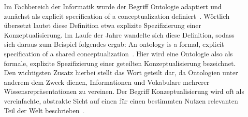 Im Fachbereich der Informatik wurde der Begriff Ontologie adaptiert und zunächst als \glqq{}explicit specification of a conceptualization\grqq{} definiert~\cite{Gruber1993}.
Wörtlich übersetzt lautet diese Definition etwa \glqq{}explizite Spezifizierung einer Konzeptualisierung\grqq{}.
Im Laufe der Jahre wandelte sich diese Definition, sodass sich daraus zum Beispiel folgendes ergab: \glqq{}An ontology is a formal, explicit specification of a shared conceptualization\grqq{}~\cite{Studer1998}.
Hier wird eine Ontologie also als \glqq{}formale, explizite Spezifizierung einer geteilten Konzeptualisierung\grqq{} bezeichnet.
Den wichtigsten Zusatz hierbei stellt das Wort \glqq{}geteilt\grqq{} dar, da Ontologien unter anderem dem Zweck dienen, Informationen und Vokabulare mehrerer Wissensrepräsentationen zu vereinen.
Der Begriff Konzeptualisierung wird oft als \glqq{}vereinfachte, abstrakte Sicht auf einen für einen bestimmten Nutzen relevanten Teil der Welt\grqq{} beschrieben~\cite{Guarino2009}.

